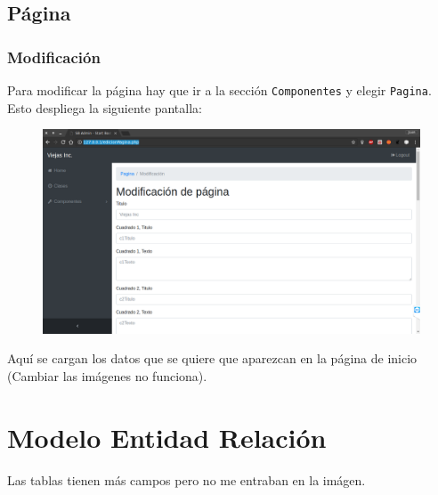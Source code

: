 \documentclass[a4paper, 12pt, spanish]{report}
\begin{document}
\section{Página}
\subsection{Modificación}
\par Para modificar la página hay que ir a la sección \verb|Componentes| y elegir \verb|Pagina|. Esto despliega la siguiente pantalla:
\begin{figure}[H]
	\centering
	\includegraphics[width=\linewidth]{imagenes/mod_mod}
	\label{fig:modmod}
\end{figure}
Aquí se cargan los datos que se quiere que aparezcan en la página de inicio (Cambiar las imágenes no funciona).

\chapter{Modelo Entidad Relación}
\par Las tablas tienen más campos pero no me entraban en la imágen.
\end{document}
